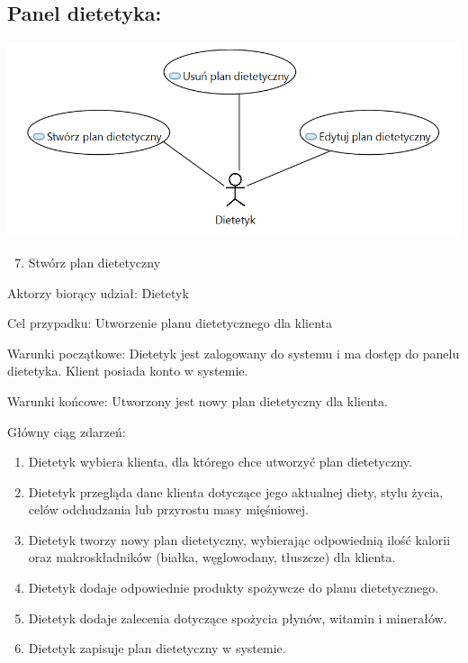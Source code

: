 \documentclass[
]{article}
\providecommand{\tightlist}{%
  \setlength{\itemsep}{0pt}\setlength{\parskip}{0pt}}
\begin{document}
\hypertarget{h.ks35fdzbeyq3}{%
\subsection{\texorpdfstring{{Panel
dietetyka:}}{Panel dietetyka:}}\label{h.ks35fdzbeyq3}}

{\includegraphics{diagrams/use_cases/dietetyk.png}}

\begin{enumerate}
\setcounter{enumi}{6}
\tightlist
\item
  {Stwórz plan dietetyczny}
\end{enumerate}

{Aktorzy biorący udział: Dietetyk}

{Cel przypadku: Utworzenie planu dietetycznego dla klienta}

{Warunki początkowe: Dietetyk jest zalogowany do systemu i ma dostęp do
panelu dietetyka. Klient posiada konto w systemie.}

{Warunki końcowe: Utworzony jest nowy plan dietetyczny dla klienta.}

{Główny ciąg zdarzeń:}

\begin{enumerate}
\tightlist
\item
  {Dietetyk wybiera klienta, dla którego chce utworzyć plan
  dietetyczny.}
\item
  {Dietetyk przegląda dane klienta dotyczące jego aktualnej diety, stylu
  życia, celów odchudzania lub przyrostu masy mięśniowej.}
\item
  {Dietetyk tworzy nowy plan dietetyczny, wybierając odpowiednią ilość
  kalorii oraz makroskładników (białka, węglowodany, tłuszcze) dla
  klienta.}
\item
  {Dietetyk dodaje odpowiednie produkty spożywcze do planu
  dietetycznego.}
\item
  {Dietetyk dodaje zalecenia dotyczące spożycia płynów, witamin i
  minerałów.}
\item
  {Dietetyk zapisuje plan dietetyczny w systemie.}
\end{enumerate}
\end{document}
